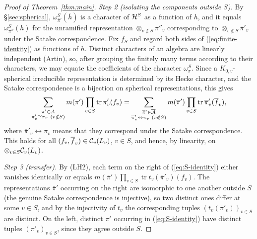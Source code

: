 \documentclass[12pt,letterpaper]{book}
\theoremstyle{plain}
\theoremstyle{definition}
\theoremstyle{remark}
\theoremstyle{remark}
\newcommand{\tr}{\operatorname{tr}}
\begin{document}
\begin{proof}[Proof of Theorem~\ref{thm:main}]
{\em Step 2 (isolating the components outside $S$).} By
\S\ref{sec:spherical}, $\omega_{\overline{\pi}'}^S(\overline{h})$ is a
character of ${\cal H}^S$ as a function of $h$, and it equals
$\omega_{\pi''}^S(h)$ for the unramified representation
$\otimes_{v\notin S}\pi''_v$ corresponding to
$\otimes_{v\notin S}\overline{\pi}'_v$ under the Satake correspondence.
Fix $f_S$ and regard both sides of (\ref{eq:finite-identity}) as
functions of $h$. Distinct characters of an algebra are linearly
independent (Artin), so, after grouping the finitely many terms
according to their characters, we may equate the coefficients of the
character $\omega_\pi^S$. Since a $K_{0,v}$-spherical irreducible
representation is determined by its Hecke character, and the Satake
correspondence is a bijection on spherical representations, this gives
\begin{equation}\label{eq:S-identity}
\sum_{\substack{\pi'\in{\cal A}\\ \pi'_v\cong\pi_v\ (v\notin S)}}
m(\pi')\prod_{v\in S}\tr \pi'_v(f_v)
=\sum_{\substack{\overline{\pi}'\in\overline{{\cal A}}\\
\overline{\pi}'_v\leftrightarrow\pi_v\ (v\notin S)}}
m(\overline{\pi}')\prod_{v\in S}\tr \overline{\pi}'_v(\overline{f}_v),
\end{equation}
where $\overline{\pi}'_v\leftrightarrow\pi_v$ means that they correspond
under the Satake correspondence. This holds for all
$(f_v,\overline{f}_v)\in{\cal C}_v(L_v)$, $v\in S$, and hence, by
linearity, on $\otimes_{v\in S}{\cal C}_v(L_v)$.

{\em Step 3 (transfer).} By (LH2), each term on the right of
(\ref{eq:S-identity}) either vanishes identically or equals
$m(\overline{\pi}')\prod_{v\in S}\tr t_v(\overline{\pi}'_v)(f_v)$.
The representations $\overline{\pi}'$ occurring on the right are
isomorphic to one another outside $S$ (the genuine Satake correspondence
is injective), so two distinct ones differ at some $v\in S$, and by the
injectivity of $t_v$ the corresponding tuples
$(t_v(\overline{\pi}'_v))_{v\in S}$ are distinct. On the left, distinct
$\pi'$ occurring in (\ref{eq:S-identity}) have distinct tuples
$(\pi'_v)_{v\in S}$, since they agree outside $S$.


\end{proof}
\end{document}
